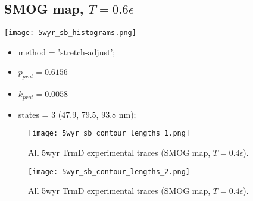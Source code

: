 \subsection{SMOG map, $T=0.6\epsilon$}
\label{subsec:5wyr-sb}
\begin{minipage}[c]{0.7\textwidth}
    \texttt{[image: 5wyr\_sb\_histograms.png]}
\end{minipage}
\hfill
\begin{minipage}[c]{0.45\textwidth}
    \begin{itemize}
        \item method = 'stretch-adjust';
        \item $p_{prot}=0.6156$
        \item $k_{prot}=0.0058$
        \item states = 3 (47.9, 79.5, 93.8 nm);
    \end{itemize}
\end{minipage}

\begin{figure}
    \centering
    \texttt{[image: 5wyr\_sb\_contour\_lengths\_1.png]}
    \caption{All 5wyr TrmD experimental traces (SMOG map, $T=0.4\epsilon$).}
    \label{fig:5wyr-sb-cl1}
\end{figure}

\begin{figure}
    \centering
    \texttt{[image: 5wyr\_sb\_contour\_lengths\_2.png]}
    \caption{All 5wyr TrmD experimental traces (SMOG map, $T=0.4\epsilon$).}
    \label{fig:5wyr-sb-cl2}
\end{figure}

